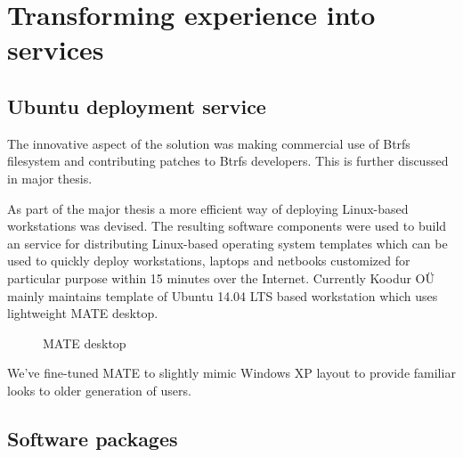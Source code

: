 \documentclass{article}
\begin{document}
\section{Transforming experience into services}

\subsection{Ubuntu deployment service}

The innovative aspect of the solution was making
commercial use of Btrfs filesystem and contributing patches
to Btrfs developers.
This is further discussed in major thesis.

As part of the major thesis a more efficient way of deploying Linux-based
workstations was devised.
The resulting software components were used to build an service for
distributing Linux-based operating system templates which can be used to
quickly deploy workstations, laptops and netbooks customized
for particular purpose within 15 minutes over the Internet.
Currently Koodur OÜ mainly maintains template of Ubuntu 14.04 LTS based
workstation which uses lightweight MATE desktop.

\begin{figure}[!htb]
\centering
{}
\caption{MATE desktop}
\label{fig:mate}
\end{figure}

We've fine-tuned MATE to slightly mimic Windows XP layout to provide
familiar looks to older generation of users.

\subsection{Software packages}
\end{document}
